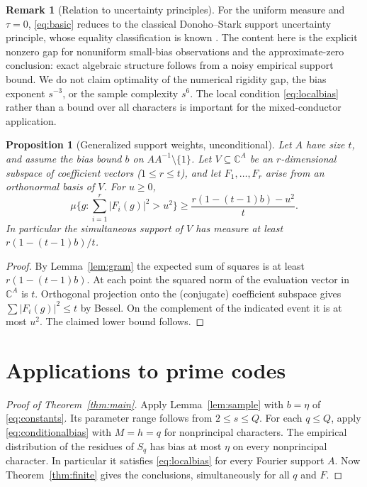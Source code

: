 \documentclass[11pt]{article}
\newtheorem{proposition}[theorem]{Proposition}
\theoremstyle{definition}\newtheorem{remark}[theorem]{Remark}
\newcommand{\C}{\mathbb C}
\begin{document}
\begin{remark}[Relation to uncertainty principles]
For the uniform measure and $\tau=0$, \eqref{eq:basic} reduces to the classical Donoho--Stark support uncertainty principle, whose equality classification is known \cite{MOP,Meshulam}. The content here is the explicit nonzero gap for nonuniform small-bias observations and the approximate-zero conclusion: exact algebraic structure follows from a noisy empirical support bound. We do not claim optimality of the numerical rigidity gap, the bias exponent $s^{-3}$, or the sample complexity $s^6$. The local condition \eqref{eq:localbias} rather than a bound over all characters is important for the mixed-conductor application.
\end{remark}

\begin{proposition}[Generalized support weights, unconditional]\label{prop:rank}
Let $A$ have size $t$, and assume the bias bound $b$ on $AA^{-1}\setminus\{1\}$. Let $V\subseteq\C^A$ be an $r$-dimensional subspace of coefficient vectors ($1\le r\le t$), and let $F_1,\ldots,F_r$ arise from an orthonormal basis of $V$. For $u\ge0$,
\[
 \mu\{g:\sum_{i=1}^r |F_i(g)|^2>u^2\}
 \ge\frac{r(1-(t-1)b)-u^2}{t}.
\]
In particular the simultaneous support of $V$ has measure at least $r(1-(t-1)b)/t$.
\end{proposition}
\begin{proof}
By Lemma~\ref{lem:gram} the expected sum of squares is at least $r(1-(t-1)b)$. At each point the squared norm of the evaluation vector in $\C^A$ is $t$. Orthogonal projection onto the (conjugate) coefficient subspace gives $\sum |F_i(g)|^2\le t$ by Bessel. On the complement of the indicated event it is at most $u^2$. The claimed lower bound follows.
\end{proof}

\section{Applications to prime codes}
\label{sec:codes}
\begin{proof}[Proof of Theorem~\ref{thm:main}]
Apply Lemma~\ref{lem:sample} with $b=\eta$ of \eqref{eq:constants}. Its parameter range follows from $2\le s\le Q$. For each $q\le Q$, apply \eqref{eq:conditionalbias} with $M=h=q$ for nonprincipal characters. The empirical distribution of the residues of $S_q$ has bias at most $\eta$ on every nonprincipal character. In particular it satisfies \eqref{eq:localbias} for every Fourier support $A$. Now Theorem~\ref{thm:finite} gives the conclusions, simultaneously for all $q$ and $F$.
\end{proof}
\end{document}
